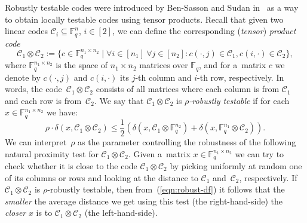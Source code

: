 \documentclass[11pt]{article}
\let\le\leqslant
\theoremstyle{plain}
\theoremstyle{definition}
\theoremstyle{remark}
\newcommand{\cC}{\mathcal{C}}
\newcommand{\F}{\mathbb{F}}
\begin{document}
Robustly testable codes were introduced by Ben-Sasson and Sudan in~\cite{Ben-Sasson:2006} as a way to obtain locally testable codes using tensor products.
Recall that given two linear codes $\cC_i\subseteq \F_q^{n}$, $i\in [2]$, we can define the corresponding (\emph{tensor}) \emph{product code} 
\[
\cC_1\otimes\cC_2 := \{c\in \F_q^{n_1\times n_2} \mid \forall i\in [n_1]\ \forall j\in [n_2]\colon c(\cdot, j) \in \cC_1, c(i,\cdot) \in \cC_2 \},
\]
where $\F_q^{n_1\times n_2}$ is the space of $n_1\times n_2$ matrices over $\F_q$, and for a~matrix $c$ we denote by $c(\cdot, j)$ and $c(i,\cdot)$ its $j$-th column and $i$-th row, respectively. In words, the code~$\cC_1\otimes\cC_2$ consists of all matrices where each column is from $\cC_1$ and each row is from~$\cC_2$. We say that $\cC_1 \otimes \cC_2$ is \emph{$\rho$-robustly testable} if for each $x\in \F_q^{n_1\times n_2}$ we have:
\begin{equation}\label{eqn:robust-df}
\rho\cdot \delta(x, \cC_1\otimes\cC_2) \le \frac12\left(\delta(x, \cC_1\otimes \F_q^{n_2}) + \delta(x, \F_q^{n_1}\otimes \cC_2)\right).
\end{equation}
We can interpret~$\rho$ as the parameter controlling the robustness of the following natural proximity test for $\cC_1\otimes\cC_2$. Given a~matrix $x\in \F_q^{n_1\times n_2}$ we can try to check whether it is close to the code $\cC_1\otimes\cC_2$ by picking uniformly at random one of its columns or rows and looking at the distance to $\cC_1$ and~$\cC_2$, respectively. If $\cC_1\otimes\cC_2$ is $\rho$-robustly testable, then from~(\ref{eqn:robust-df}) it follows that the \emph{smaller} the average distance we get using this test (the right-hand-side) the \emph{closer} $x$ is to $\cC_1\otimes\cC_2$ (the left-hand-side).
\end{document}
